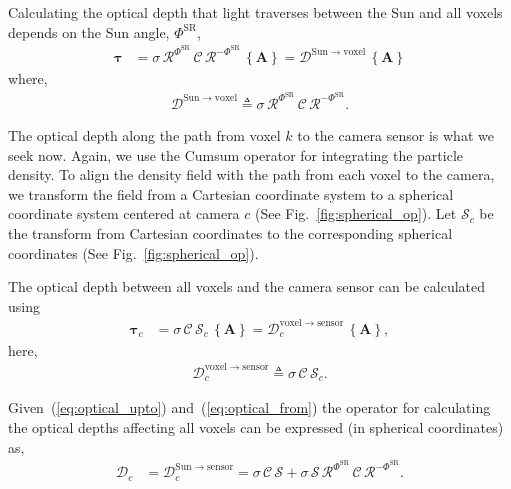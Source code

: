 \documentclass[10pt,twocolumn,letterpaper]{article}
\newcommand{\OpSphere}{\bm{\mathcal{S}}}
\newcommand{\OpRot}{\bm{\mathcal{R}}}
\newcommand{\OpDistance}{\bm{\mathcal{D}}}
\newcommand{\OpCumsum}{\bm{\mathcal{C}}}
\newcommand{\curly}[1]{\left\{#1\right\}}
\newcommand{\vect}[1]{\bm{#1}}
\newcommand{\mat}[1]{\bm{#1}}
\begin{document}
Calculating the optical depth that light traverses between the Sun and
all voxels depends on the Sun angle, $\Phi^{\mathrm{SR}}$,
\begin{align}
  \vect{\tau}&=\sigma \, \OpRot^{{\Phi^{\mathrm{SR}}}} \, \OpCumsum \,
  \OpRot^{-\Phi^{\mathrm{SR}}} \,
  \curly{\mat{A}}=\OpDistance^{\mathrm{Sun \rightarrow voxel}} \,
  \curly{\mat{A}}
  \label{eq:optical_upto}
\end{align}
where,
\begin{align}
  \OpDistance^{\mathrm{Sun \rightarrow voxel}}\triangleq\sigma \,
  \OpRot^{{\Phi^{\mathrm{SR}}}} \, \OpCumsum \,
  \OpRot^{-\Phi^{\mathrm{SR}}}.
  \label{eq:distance_sun_voxel}
\end{align}

The optical depth along the path from voxel $k$ to the camera sensor
is what we seek now.  Again, we use the Cumsum operator for
integrating the particle density.  To align the density field with the
path from each voxel to the camera, we transform the field from a
Cartesian coordinate system to a spherical coordinate system centered
at camera $c$ (See Fig.~\ref{fig:spherical_op}). Let $\OpSphere_c$ be
the transform from Cartesian coordinates to the corresponding
spherical coordinates (See Fig.~\ref{fig:spherical_op}).

The optical depth between all voxels and the camera sensor can be
calculated using
\begin{align}
  \vect{\tau}_c &= \sigma \, \OpCumsum \, \OpSphere_c \,
  \curly{\mat{A}} = \OpDistance^{\mathrm{voxel \rightarrow sensor}}_c
  \, \curly{\mat{A}},
  \label{eq:optical_from}
\end{align}
here,
\begin{align}
  \OpDistance^{\mathrm{voxel \rightarrow sensor}}_c \triangleq \sigma
  \, \OpCumsum \, \OpSphere_c.
  \label{eq:distance_voxel_sensor}
\end{align}

Given~(\ref{eq:optical_upto}) and~(\ref{eq:optical_from}) the operator
for calculating the optical depths affecting all voxels can be
expressed (in spherical coordinates) as,
\begin{align}
  \OpDistance_c &= \OpDistance^{\mathrm{Sun \rightarrow sensor}}_c =
  \sigma \, \OpCumsum \, \OpSphere + \sigma \, \OpSphere \,
  \OpRot^{\Phi^{\mathrm{SR}}} \, \OpCumsum \,
  \OpRot^{-\Phi^{\mathrm{SR}}}.
  \label{eq:optical_operation}
\end{align}
\end{document}
